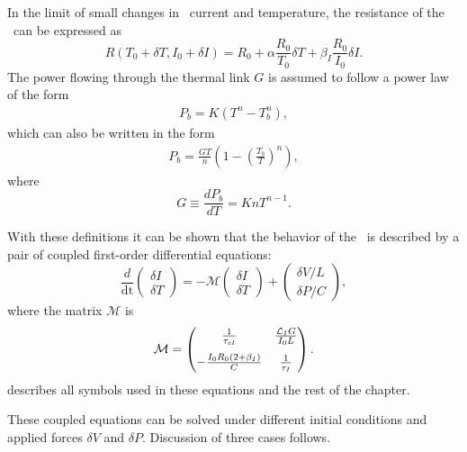 In the limit of small changes in \TES\ current and temperature, the resistance of the \TES\ can be expressed as
\begin{equation}
R(T_0+\delta T,I_0+\delta I) = R_0 + \alpha \frac{R_0}{T_0} \delta T + %
									 \beta_I \frac{R_0}{I_0} \delta I.
\end{equation}
The power flowing through the thermal link $G$ is assumed to follow a power law of the form
\begin{eqnarray} \label{eqn:ch3-p-bath}
P_{b} = K(T^n - T^n_{b}),
\end{eqnarray}
which can also be written in the form
\begin{eqnarray}
P_{b} = \frac{GT}{n}\left(1 - \left(\frac{T_{b}}{T}\right)^n\right),
\end{eqnarray}
where
\begin{equation}
G \equiv \frac{d P_{b}}{dT} = K n T^{n-1}.
\end{equation}

With these definitions it can be shown \cite{irwin_transition-edge_2005} that the behavior of the \TES\ is described by a pair of coupled first-order differential equations:
\begin{equation}
\frac{d}{\mathop{dt}} \begin{pmatrix} \delta I \\ \delta T \end{pmatrix}
	= - \mathcal{M} \begin{pmatrix}	\delta I \\	\delta T \end{pmatrix}
      + \begin{pmatrix} \delta V / L \\ \delta P /C \end{pmatrix},
\end{equation}
where the matrix $\mathcal{M}$ is
\begin{equation}
\mathcal{M} = \begin{pmatrix}
		\frac{1}{\tau_{el}} & \frac{\mathcal{L}_I G}{I_0 L} \\[0.75em] 
		-\frac{I_0 R_0(2 + \beta_I)}{C} & \frac{1}{\tau_I}
    \end{pmatrix}.
\end{equation}
 describes all symbols used in these equations and the rest of the chapter.

These coupled equations can be solved under different initial conditions and applied forces $\delta V$ and $\delta P$.
Discussion of three cases follows.

